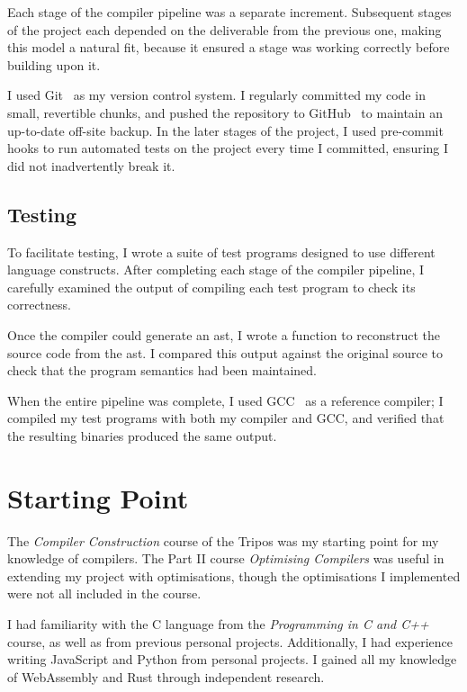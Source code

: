 \documentclass[00-main.tex]{subfiles}
\begin{document}
Each stage of the compiler pipeline was a separate increment.
Subsequent stages of the project each depended on the deliverable from the previous one, making this model a natural fit, because it ensured a stage was working correctly before building upon it.

I used Git~ as my version control system.
I regularly committed my code in small, revertible chunks, and pushed the repository to GitHub~ to maintain an up-to-date off-site backup.
In the later stages of the project, I used pre-commit hooks to run automated tests on the project every time I committed, ensuring I did not inadvertently break it.

\subsection{Testing}

To facilitate testing, I wrote a suite of test programs designed to use different language constructs.
After completing each stage of the compiler pipeline, I carefully examined the output of compiling each test program to check its correctness.

Once the compiler could generate an \gls{ast}, I wrote a function to reconstruct the source code from the \gls{ast}.
I compared this output against the original source to check that the program semantics had been maintained.

When the entire pipeline was complete, I used GCC~ as a reference compiler; I compiled my test programs with both my compiler and GCC, and verified that the resulting binaries produced the same output.

\section{Starting Point}

The \emph{Compiler Construction} course of the Tripos was my starting point for my knowledge of compilers.
The Part II course \emph{Optimising Compilers} was useful in extending my project with optimisations, though the optimisations I implemented were not all included in the course.

I had familiarity with the C language from the \emph{Programming in C and C++} course, as well as from previous personal projects.
Additionally, I had experience writing JavaScript and Python from personal projects.
I gained all my knowledge of WebAssembly and Rust through independent research.
\end{document}

